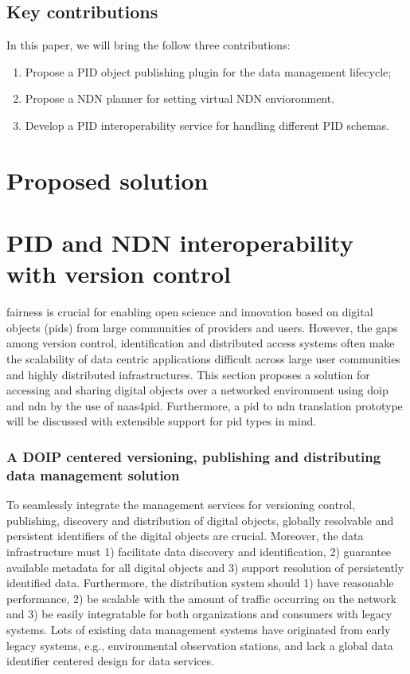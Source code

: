 \documentclass[conference]{IEEEtran}
\begin{document}
\subsection{Key contributions}
In this paper, we will bring the follow three contributions:
\begin{enumerate}
    \item Propose a PID object publishing plugin for the data management lifecycle; 
    \item Propose a NDN planner for setting virtual NDN envioronment.
    \item Develop a PID interoperability service for handling different PID schemas. 
\end{enumerate}


\section{Proposed solution}

\section{PID and NDN interoperability with version control}
\label{pid-interoperability}

\gls{fairness} is crucial for enabling open science and innovation based on digital objects (\glspl{pid}) from large communities of providers and users. However, the gaps among version control, identification and distributed access systems often make the scalability of data centric applications difficult across large user communities and highly distributed infrastructures. This section proposes a solution for accessing and sharing digital objects over a networked environment using \gls{doip} and \gls{ndn} by the use of \gls{naas4pid}. Furthermore, a \gls{pid} to \gls{ndn} translation prototype will be discussed with extensible support for \gls{pid} types in mind.

\subsubsection{A DOIP centered versioning, publishing and distributing data management solution}
To seamlessly integrate the management services for versioning control, publishing, discovery and distribution of digital objects, globally resolvable and persistent identifiers of the digital objects are crucial. Moreover, the data infrastructure must 1) facilitate data discovery and identification, 2) guarantee available metadata for all digital objects and 3) support resolution of persistently identified data. Furthermore, the distribution system should 1) have reasonable performance, 2) be scalable with the amount of traffic occurring on the network and 3) be easily integratable for both organizations and consumers with legacy systems. Lots of existing data management systems have originated from early legacy systems, e.g., environmental observation stations, and lack a global data identifier centered design for data services.
\end{document}
